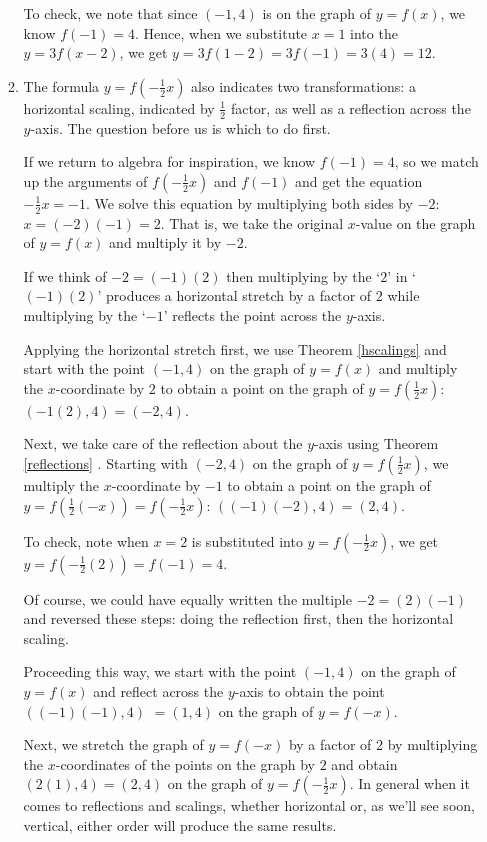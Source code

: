 \begin{ex}
\begin{enumerate}
\begin{enumerate}
 To check, we note that since $(-1,4)$ is on the graph of $y=f(x)$, we know $f(-1)=4$.  Hence, when we substitute $x=1$ into the $y=3f(x-2)$, we get $y=3f(1-2) = 3f(-1) = 3(4) = 12$.
 
 \item The formula $y = f\left(-\frac{1}{2} x \right)$ also indicates two transformations:  a horizontal scaling, indicated by $\frac{1}{2}$ factor, as well as a reflection across the $y$-axis.  The question before us is which to do first. 
 
  If we return to algebra for inspiration, we know $f(-1) = 4$, so we match up the arguments of $f\left(-\frac{1}{2} x \right)$ and $f(-1)$ and get the equation $-\frac{1}{2} x  = -1$. We solve this equation by multiplying both sides by $-2$:  $x = (-2)(-1) = 2$.  That is, we take the original $x$-value on the graph of $y=f(x)$ and multiply it by $-2$.  
  
  If we think of $-2= (-1)(2)$ then multiplying by the `$2$' in `$(-1)(2)$' produces a horizontal stretch by a factor of $2$ while multiplying by the `$-1$'  reflects the point across the $y$-axis. 
  
   Applying the horizontal stretch first, we use Theorem \ref{hscalings} and start with the point $(-1,4)$ on the graph of $y=f(x)$ and multiply the $x$-coordinate by $2$ to obtain a point on the graph of $y=f\left(\frac{1}{2} x\right)$:  $(-1(2), 4) = (-2,4)$.   
   
   Next, we take care of the reflection about the $y$-axis using  Theorem \ref{reflections} .  Starting with $(-2,4)$ on the graph of $y=f\left(\frac{1}{2} x \right)$, we multiply the $x$-coordinate by $-1$ to obtain a point on the graph of  $y =  f\left(\frac{1}{2} (-x) \right) =  f\left(-\frac{1}{2} x \right)$:   $((-1)(-2),4) = (2,4)$. 
   
 To check, note when $x=2$ is substituted into $y =  f\left(-\frac{1}{2} x \right)$, we get $y =  f\left(-\frac{1}{2} (2)  \right) = f(-1) = 4$.
 
 Of course, we could have equally written the multiple $-2 = (2)(-1)$ and reversed these steps:  doing the reflection first, then the horizontal scaling. 
 
Proceeding this way, we start with the point $(-1,4)$ on the graph of $y=f(x)$ and reflect across the $y$-axis to obtain the point $((-1)(-1), 4)$ $= (1,4)$ on the graph of $y = f(-x)$.  

Next, we stretch the graph of $y=f(-x)$ by a factor of $2$ by multiplying the $x$-coordinates of the points on the graph by $2$ and obtain $(2(1), 4) = (2,4)$ on the graph of $y=f\left(-\frac{1}{2} x\right)$.  
 In general when it comes to reflections and scalings, whether horizontal or, as we'll see soon, vertical, either order will produce the same results.
 

\end{enumerate}
\end{enumerate}
\end{ex}
